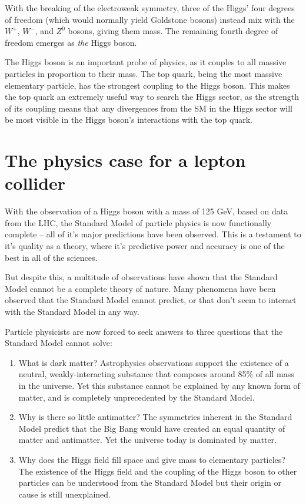 With the breaking of the electroweak symmetry, three of the Higgs' four degrees of freedom (which would normally yield Goldstone bosons) instead mix with the $W^+$, $W^-$, and $Z^0$ bosons, giving them mass. The remaining fourth degree of freedom emerges as \textit{the} Higgs boson. 

The Higgs boson is an important probe of physics, as it couples to all massive particles in proportion to their mass. The top quark, being the most massive elementary particle, has the strongest coupling to the Higgs boson. This makes the top quark an extremely useful way to search the Higgs sector, as the strength of its coupling means that any divergences from the \acrshort{SM} in the Higgs sector will be most visible in the Higgs boson's interactions with the top quark. 

\section{The physics case for a lepton collider}
With the observation of a Higgs boson with a mass of 125 GeV, based on data from the \acrlong{LHC}, the Standard Model of particle physics is now functionally complete -- all of it's major predictions have been observed. This is a testament to it's quality as a theory, where it's predictive power and accuracy is one of the best in all of the sciences.

But despite this, a multitude of observations have shown that the Standard Model cannot be a complete theory of nature. Many phenomena have been observed that the Standard Model cannot predict, or that don't seem to interact with the Standard Model in any way.

Particle physicists are now forced to seek answers to three questions that the Standard Model cannot solve:

\begin{enumerate}
	\item What is dark matter? Astrophysics observations support the existence of a neutral, weakly-interacting substance that composes around 85\% of all mass in the universe. Yet this substance cannot be explained by any known form of matter, and is completely unprecedented by the Standard Model.
	\item Why is there so little antimatter? The symmetries inherent in the Standard Model predict that the Big Bang would have created an equal quantity of matter and antimatter. Yet the universe today is dominated by matter.
	\item Why does the Higgs field fill space and give mass to elementary particles? The existence of the Higgs field and the coupling of the Higgs boson to other particles can be understood from the Standard Model but their origin or cause is still unexplained.
\end{enumerate}

